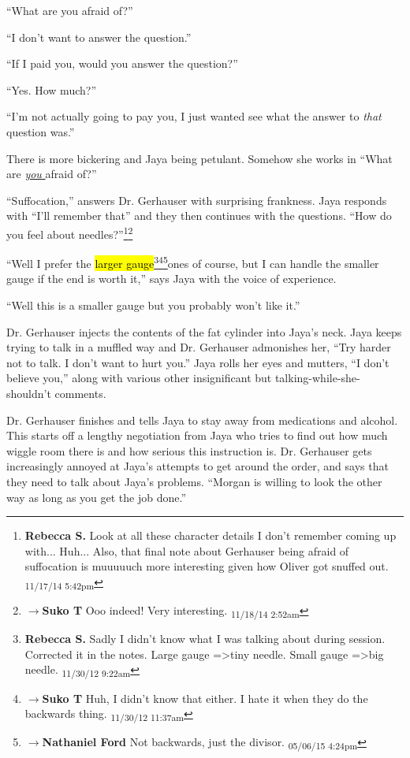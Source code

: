 ``What are you afraid of?''

``I don't want to answer the question.''

``If I paid you, would you answer the question?''

``Yes.  How much?''

``I'm not actually going to pay you, I just wanted see what the answer to \textit{that} question was.''

There is more bickering and Jaya being petulant.  Somehow she works in ``What are \underline{ \textit{you} } afraid of?''

``Suffocation,'' answers Dr. Gerhauser with surprising frankness.  Jaya responds with ``I'll remember that'' and they then continues with the questions.  ``How do you feel about needles?''\footnote{\textbf{Rebecca S. }Look at all these character details I don't remember coming up with... Huh... 
Also, that final note about Gerhauser being afraid of suffocation is muuuuuch more interesting given how Oliver got snuffed out. \textsubscript{11/17/14 5:42pm}}\footnote{$\rightarrow$\textbf{Suko T }Ooo indeed!  Very interesting. \textsubscript{11/18/14 2:52am}}

``Well I prefer the \hl{larger gauge}\footnote{\textbf{Rebecca S. }Sadly I didn't know what I was talking about during session.  Corrected it in the notes.  Large gauge =\textgreater  tiny needle.  Small gauge =\textgreater  big needle. \textsubscript{11/30/12 9:22am}}\footnote{$\rightarrow$\textbf{Suko T }Huh, I didn't know that either.  I hate it when they do the backwards thing. \textsubscript{11/30/12 11:37am}}\footnote{$\rightarrow$\textbf{Nathaniel Ford }Not backwards, just the divisor. \textsubscript{05/06/15 4:24pm}}ones of course, but I can handle the smaller gauge if the end is worth it,'' says Jaya with the voice of experience.

``Well this is a smaller gauge but you probably won't like it.''



Dr. Gerhauser injects the contents of the fat cylinder into Jaya's neck.  Jaya keeps trying to talk in a muffled way and Dr. Gerhauser admonishes her, ``Try harder not to talk.  I don't want to hurt you.''  Jaya rolls her eyes and mutters, ``I don't believe you,'' along with various other insignificant but talking-while-she-shouldn't comments. 



Dr. Gerhauser finishes and tells Jaya to stay away from medications and alcohol.  This starts off a lengthy negotiation from Jaya who tries to find out how much wiggle room there is and how serious this instruction is. Dr. Gerhauser gets increasingly annoyed at Jaya's attempts to get around the order, and says that they need to talk about Jaya's problems.  ``Morgan is willing to look the other way as long as you get the job done.''

